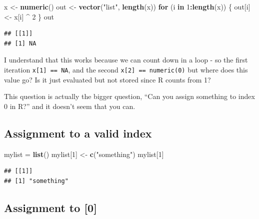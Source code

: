 \documentclass[]{book}
\newenvironment{Shaded}{\begin{snugshade}}{\end{snugshade}}
\newcommand{\ControlFlowTok}[1]{\textcolor[rgb]{0.13,0.29,0.53}{\textbf{#1}}}
\newcommand{\DecValTok}[1]{\textcolor[rgb]{0.00,0.00,0.81}{#1}}
\newcommand{\KeywordTok}[1]{\textcolor[rgb]{0.13,0.29,0.53}{\textbf{#1}}}
\newcommand{\NormalTok}[1]{#1}
\newcommand{\OperatorTok}[1]{\textcolor[rgb]{0.81,0.36,0.00}{\textbf{#1}}}
\newcommand{\StringTok}[1]{\textcolor[rgb]{0.31,0.60,0.02}{#1}}
\begin{document}
\begin{Shaded}
\begin{Highlighting}[]
\NormalTok{x <-}\StringTok{ }\KeywordTok{numeric}\NormalTok{()}
\NormalTok{out <-}\StringTok{ }\KeywordTok{vector}\NormalTok{(}\StringTok{"list"}\NormalTok{, }\KeywordTok{length}\NormalTok{(x))}
\ControlFlowTok{for}\NormalTok{ (i }\ControlFlowTok{in} \DecValTok{1}\OperatorTok{:}\KeywordTok{length}\NormalTok{(x)) \{}
\NormalTok{  out[i] <-}\StringTok{ }\NormalTok{x[i] }\OperatorTok{^}\StringTok{ }\DecValTok{2}
\NormalTok{\}}
\NormalTok{out}
\end{Highlighting}
\end{Shaded}

\begin{verbatim}
## [[1]]
## [1] NA
\end{verbatim}

I understand that this works because we can count down in a loop - so the first iteration \texttt{x{[}1{]}\ ==\ NA}, and the second \texttt{x{[}2{]}\ ==\ numeric(0)} but where does this value go? Is it just evaluated but not stored since R counts from 1?

This question is actually the bigger question, ``Can you assign something to index 0 in R?'' and it doesn't seem that you can.

\hypertarget{assignment-to-a-valid-index}{%
\subsection*{Assignment to a valid index}\label{assignment-to-a-valid-index}}

\begin{Shaded}
\begin{Highlighting}[]
\NormalTok{mylist =}\StringTok{ }\KeywordTok{list}\NormalTok{()}
\NormalTok{mylist[}\DecValTok{1}\NormalTok{] <-}\StringTok{ }\KeywordTok{c}\NormalTok{(}\StringTok{"something"}\NormalTok{)}
\NormalTok{mylist[}\DecValTok{1}\NormalTok{]}
\end{Highlighting}
\end{Shaded}

\begin{verbatim}
## [[1]]
## [1] "something"
\end{verbatim}

\hypertarget{assignment-to-0}{%
\subsection*{Assignment to {[}0{]}}\label{assignment-to-0}}
\end{document}
